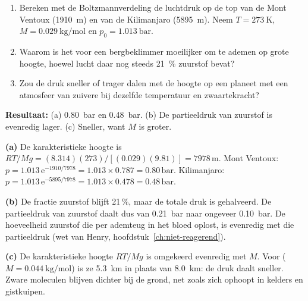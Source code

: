 \begin{oefening}
\begin{enumerate}
\item[(a)] Bereken met de Boltzmannverdeling de luchtdruk op de top van de Mont Ventoux (\SI{1910}{\metre}) en van de Kilimanjaro (\SI{5895}{\metre}). Neem $T = \SI{273}{\kelvin}$, $M = \SI{0.029}{\kilo\gram\per\mole}$ en $p_0 = \SI{1.013}{\bar}$.
\item[(b)] Waarom is het voor een bergbeklimmer moeilijker om te ademen op grote hoogte, hoewel lucht daar nog steeds \SI{21}{\percent} zuurstof bevat?
\item[(c)] Zou de druk sneller of trager dalen met de hoogte op een planeet met een atmosfeer van zuivere  bij dezelfde temperatuur en zwaartekracht?
\end{enumerate}
\end{oefening}
\begin{oplossing}
\textbf{Resultaat:} (a) \SI{0.80}{\bar} en \SI{0.48}{\bar}. (b) De partieeldruk van zuurstof is evenredig lager. (c) Sneller, want $M$ is groter.

\textbf{(a)} De karakteristieke hoogte is $RT/Mg = (8.314)(273)/[(0.029)(9.81)] = 7978\,\mathrm{m}$.
Mont Ventoux: $p = 1.013\,\mathrm{e}^{-1910/7978} = 1.013 \times 0.787 = 0.80\,\mathrm{bar}$.
Kilimanjaro: $p = 1.013\,\mathrm{e}^{-5895/7978} = 1.013 \times 0.478 = 0.48\,\mathrm{bar}$.

\textbf{(b)} De fractie zuurstof blijft 21\,\%, maar de totale druk is gehalveerd. De partieeldruk van zuurstof daalt dus van \SI{0.21}{\bar} naar ongeveer \SI{0.10}{\bar}. De hoeveelheid zuurstof die per ademteug in het bloed oplost, is evenredig met die partieeldruk (wet van Henry, hoofdstuk~\ref{ch:niet-reagerend}).

\textbf{(c)} De karakteristieke hoogte $RT/Mg$ is omgekeerd evenredig met $M$. Voor  ($M = \SI{0.044}{\kilo\gram\per\mole}$) is ze \SI{5.3}{\kilo\metre} in plaats van \SI{8.0}{\kilo\metre}: de druk daalt sneller. Zware moleculen blijven dichter bij de grond, net zoals  zich ophoopt in kelders en gistkuipen.
\end{oplossing}


